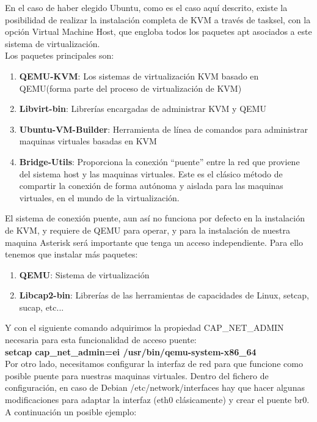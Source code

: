En el caso de haber elegido Ubuntu, como es el caso aquí descrito, existe la posibilidad de realizar la instalación completa de KVM a través de tasksel, con la opción Virtual Machine Host, que engloba todos los paquetes apt asociados a este sistema de virtualización.\\

Los paquetes principales son:

\begin{enumerate}
\item \textbf{QEMU-KVM}: Los sistemas de virtualización KVM basado en QEMU(forma parte del proceso de virtualización de KVM)
\item \textbf{Libvirt-bin}: Librerías encargadas de administrar KVM y QEMU
\item \textbf{Ubuntu-VM-Builder}: Herramienta de línea de comandos para administrar maquinas virtuales basadas en KVM
\item \textbf{Bridge-Utils}: Proporciona la conexión “puente” entre la red que proviene del sistema host y las maquinas virtuales. Este es el clásico método de compartir la conexión de forma autónoma y aislada para las maquinas virtuales, en el mundo de la virtualización.
\end{enumerate}

El sistema de conexión puente, aun así no funciona por defecto en la instalación de KVM, y requiere de QEMU para operar, y para la instalación de nuestra maquina Asterisk será importante que tenga un acceso independiente. Para ello tenemos que instalar más paquetes:

\begin{enumerate}
\item \textbf{QEMU}: Sistema de virtualización
\item \textbf{Libcap2-bin}: Librerías de las herramientas de capacidades de Linux, setcap, sucap, etc...
\end{enumerate}

Y con el siguiente comando adquirimos la propiedad CAP\_NET\_ADMIN necesaria para esta funcionalidad de acceso puente:\\

\textbf{setcap cap\_net\_admin=ei /usr/bin/qemu-system-x86\_64}\\

Por otro lado, necesitamos configurar la interfaz de red para que funcione como posible puente para nuestras maquinas virtuales. Dentro del fichero de configuración, en caso de Debian /etc/network/interfaces hay que hacer algunas modificaciones para adaptar la interfaz (eth0 clásicamente) y crear el puente br0. A continuación un posible ejemplo:\\

